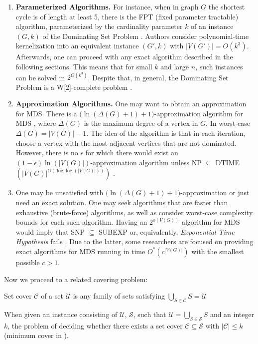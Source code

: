 \begin{enumerate}
    \item \textbf{Parameterized Algorithms.} For instance, when in graph $G$ the shortest cycle is of length at least 5, there is the FPT (fixed parameter tractable) algorithm, parameterized by the cardinality parameter $k$ of an instance $(G, k)$ of the Dominating Set Problem \cite{cygan2015parameterized}. Authors consider polynomial-time kernelization into an equivalent instance $(G', k)$ with $|V(G')| = O(k^3)$. Afterwards, one can proceed with any exact algorithm described in the following sections. This means that for small $k$ and large $n$, such instances can be solved in $2^{O(k^3)}$. Despite that, in general, the Dominating Set Problem is a W[2]-complete problem \cite{downey1992fixed}.
    \item \textbf{Approximation Algorithms.} One may want to obtain an approximation for MDS. There is a $\big(\ln(\Delta(G) + 1) + 1\big)$-approximation algorithm for MDS \cite{KLASING200475}, where $\Delta(G)$ is the maximum degree of a vertex in $G$. In worst-case $\Delta(G) = |V(G)| - 1$. The idea of the algorithm is that in each iteration, choose a vertex with the most adjacent vertices that are not dominated. However, there is no $\epsilon$ for which there would exist an  $(1-\epsilon)\ln(|V(G)|)$-approximation algorithm unless NP $\subseteq$ DTIME$(|V(G)|^{O(\log \log(|V(G)|))})$ \cite{KLASING200475}.
    \item One may be unsatisfied with $\big(\ln(\Delta(G) + 1) + 1\big)$-approximation or just need an exact solution. One may seek algorithms that are faster than exhaustive (brute-force) algorithms, as well as consider worst-case complexity bounds for each such algorithm. Having an $2^{o(V(G))}$ algorithm for MDS would imply that SNP $\subseteq$ SUBEXP \cite{FominKratschWoeginger10.1007/978-3-540-30559-0_21} or, equivalently, \textit{Exponential Time Hypothesis} fails \cite{Impagliazzo10.1006/jcss.2000.1727}. Due to the latter, some researchers are focused on providing exact algorithms for MDS running in time $O^*(c^{|V(G)|})$ with the smallest possible $c > 1$.
\end{enumerate}
Now we proceed to a related covering problem:
\begin{definition}
Set cover $\mathcal{C}$ of a set $\mathcal{U}$ is any family of sets satisfying $\bigcup_{S\in \mathcal{C}} S = \mathcal{U}$
\end{definition}
\begin{definition}
When given an instance consisting of $\mathcal{U}$, $\mathcal{S}$, such that $\mathcal{U} = \bigcup_{S\in\mathcal{S}} S$ and an integer $k$, the problem of deciding whether there exists a set cover $\mathcal{C} \subseteq \mathcal{S}$ with $|\mathcal{C}| \leq k$ (minimum cover in \cite{Garey90}).
\end{definition}
